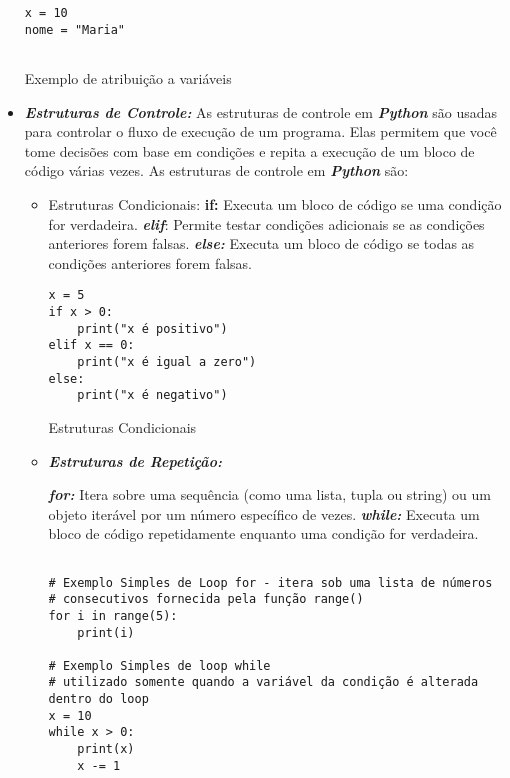 \documentclass[a4paper, 12pt, onecolumn,singlespacing]{article}
\begin{document}
\begin{itemize}
\begin{listing}[!ht]
\begin{verbatim}
x = 10
nome = "Maria"
			
	\end{verbatim}
	\label{exemplo_curto_atribuição}
	\caption{Exemplo de atribuição a variáveis}
\end{listing}
	\item \textbf{\textit{Estruturas de Controle:}} As estruturas de controle em \textbf{\textit{Python}} são usadas para controlar o fluxo de execução de um programa. Elas permitem que você tome decisões com base em condições e repita a execução de um bloco de código várias vezes. As estruturas de controle em \textbf{\textit{Python}} são:
	\begin{itemize}
		\item 	Estruturas Condicionais:
			\subitem \textbf{if:} Executa um bloco de código se uma condição for verdadeira.
			\subitem \textbf{\textit{elif}}: Permite testar condições adicionais se as condições anteriores forem falsas.
			\subitem \textbf{\textit{else:}} Executa um bloco de código se todas as condições anteriores forem falsas.
		\pagebreak
\begin{listing}[!ht]
\begin{verbatim}
x = 5
if x > 0:
	print("x é positivo")
elif x == 0:
	print("x é igual a zero")
else:
	print("x é negativo")

\end{verbatim}
\label{exemplo_estruturas_condicionais}
\caption{Estruturas Condicionais}
\end{listing}
		\item \textbf{\textit{Estruturas de Repetição:}}
		
			\subitem \textbf{\textit{for:}} Itera sobre uma sequência (como uma lista, tupla ou string) ou um objeto iterável por um número específico de vezes.
			\subitem \textbf{\textit{while:}} Executa um bloco de código repetidamente enquanto uma condição for verdadeira.
\begin{listing}[!ht]
\begin{verbatim}
	
# Exemplo Simples de Loop for - itera sob uma lista de números
# consecutivos fornecida pela função range()
for i in range(5):
	print(i)

# Exemplo Simples de loop while
# utilizado somente quando a variável da condição é alterada dentro do loop
x = 10
while x > 0:
	print(x)
	x -= 1


\end{verbatim}
\end{listing}
\end{itemize}
\end{itemize}
\end{document}
